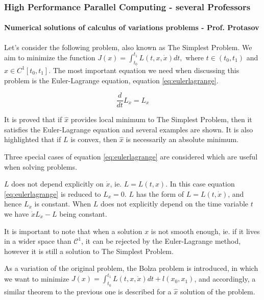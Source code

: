 \documentclass{article}
\begin{document}
\subsubsection{High Performance Parallel Computing - several Professors}

\paragraph{Numerical solutions of calculus of variations problems - Prof. Protasov}
Let's consider the following problem, also known as The Simplest Problem. We aim to minimize the function $J(x) = \int_{t_0}^{t_1}L(t,x,\dot{x})dt ,$ where $t \in (t_0,t_1)$ and $x \in C^1[t_0,t_1]$. The most important equation we need when discussing this problem is the Euler-Lagrange equation, equation \ref{eq:eulerlagrange}.

\begin{equation} \label{eq:eulerlagrange}
\frac{d}{dt}L_{\dot{x}} = L_x
\end{equation}

It is proved that if $\hat{x}$ provides local minimum to The Simplest Problem, then it satisfies the Euler-Lagrange equation and several examples are shown. It is also highlighted that if $L$ is convex, then $\hat{x}$ is necessarily an absolute minimum.

Three special cases of equation \ref{eq:eulerlagrange} are considered which are useful when solving problems.

\begin{outline}[enumerate]

\1 $L$ does not depend explicitly on $\dot{x}$, ie. $L = L(t,x)$. In this case equation \ref{eq:eulerlagrange} is reduced to $L_x = 0$.
\1 $L$ has the form of $L = L(t, \dot{x})$, and hence $L_{\dot{x}}$ is constant.
\1 When $L$ does not explicitly depend on the time variable $t$ we have $\dot{x}L_{\dot{x}} - L$ being constant.

\end{outline}

It is important to note that when a solution $x$ is not smooth enough, ie. if it lives in a wider space than $\mathcal{C}^1$, it can be rejected by the Euler-Lagrange method, however it is still a solution to The Simplest Problem.

As a variation of the original problem, the Bolza problem is introduced, in which we want to minimize $J(x) = \int_{t_0}^{t_1}L(t,x,\dot{x})dt + l(x_0, x_1)$, and accordingly, a similar theorem to the previous one is described for a $\hat{x}$ solution of the problem.
\end{document}
